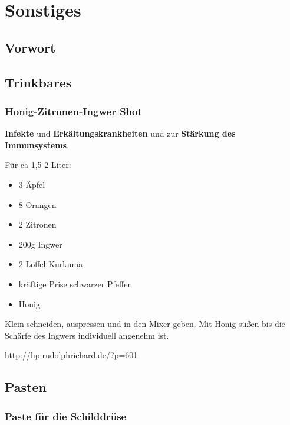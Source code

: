 \chapter{Sonstiges}

\section{Vorwort}

\lipsum[1-5]
\newpage



\section{Trinkbares}

\subsection{Honig-Zitronen-Ingwer Shot}


\textbf{Infekte} und \textbf{Erkältungskrankheiten} und zur \textbf{Stärkung des Immunsystems}. 

  

Für ca 1,5-2 Liter:
\begin{itemize}
	\item 3 Äpfel
	\item 8 Orangen
	\item 2 Zitronen
	\item 200g Ingwer
	\item 2 Löffel Kurkuma
	\item kräftige Prise schwarzer Pfeffer
	\item Honig
\end{itemize}

Klein schneiden, auspressen und in den Mixer geben. Mit Honig süßen bis die Schärfe des Ingwers individuell angenehm ist.

\url{http://hp.rudolphrichard.de/?p=601}



\newpage







\section{Pasten}

\subsection{Paste für die Schilddrüse}
 
